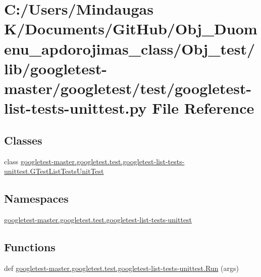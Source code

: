 \hypertarget{_obj__test_2lib_2googletest-master_2googletest_2test_2googletest-list-tests-unittest_8py}{}\section{C\+:/\+Users/\+Mindaugas K/\+Documents/\+Git\+Hub/\+Obj\+\_\+\+Duomenu\+\_\+apdorojimas\+\_\+class/\+Obj\+\_\+test/lib/googletest-\/master/googletest/test/googletest-\/list-\/tests-\/unittest.py File Reference}
\label{_obj__test_2lib_2googletest-master_2googletest_2test_2googletest-list-tests-unittest_8py}
\subsection*{Classes}
\begin{DoxyCompactItemize}
\item 
class \mbox{\hyperlink{classgoogletest-master_1_1googletest_1_1test_1_1googletest-list-tests-unittest_1_1_g_test_list_tests_unit_test}{googletest-\/master.\+googletest.\+test.\+googletest-\/list-\/tests-\/unittest.\+G\+Test\+List\+Tests\+Unit\+Test}}
\end{DoxyCompactItemize}
\subsection*{Namespaces}
\begin{DoxyCompactItemize}
\item 
 \mbox{\hyperlink{namespacegoogletest-master_1_1googletest_1_1test_1_1googletest-list-tests-unittest}{googletest-\/master.\+googletest.\+test.\+googletest-\/list-\/tests-\/unittest}}
\end{DoxyCompactItemize}
\subsection*{Functions}
\begin{DoxyCompactItemize}
\item 
def \mbox{\hyperlink{namespacegoogletest-master_1_1googletest_1_1test_1_1googletest-list-tests-unittest_ac6c4ea0539f01de4f53cadb187c724f4}{googletest-\/master.\+googletest.\+test.\+googletest-\/list-\/tests-\/unittest.\+Run}} (args)
\end{DoxyCompactItemize}
